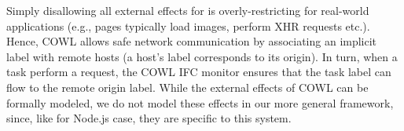 Simply disallowing all external effects for is overly-restricting for
real-world applications (e.g., pages typically load images, perform
XHR requests etc.).
%
Hence, COWL allows safe network communication by associating an
implicit label with remote hosts (a host's label corresponds to
its origin).
%
In turn, when a task perform a request, the COWL IFC monitor
ensures that the task label can flow to the remote origin label.
%
While the external effects of COWL can be formally modeled, we do not
model these effects in our more general framework, since, like for
Node.js case, they are specific to this system.
%



%






